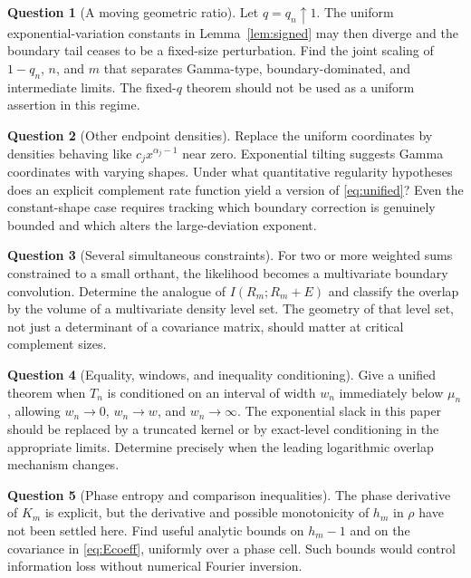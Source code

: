 \documentclass[11pt,a4paper]{article}
\numberwithin{equation}{section}
\theoremstyle{definition}
\newtheorem{question}{Question}
\theoremstyle{remark}
\begin{document}
\begin{question}[A moving geometric ratio]
Let $q=q_n\uparrow1$. The uniform exponential-variation constants in
Lemma~\ref{lem:signed} may then diverge and the boundary tail ceases
to be a fixed-size perturbation. Find the joint scaling of $1-q_n$,
$n$, and $m$ that separates Gamma-type, boundary-dominated, and
intermediate limits. The fixed-$q$ theorem should not be used as a
uniform assertion in this regime.
\end{question}

\begin{question}[Other endpoint densities]
Replace the uniform coordinates by densities behaving like
$c_jx^{\alpha_j-1}$ near zero. Exponential tilting suggests Gamma
coordinates with varying shapes. Under what quantitative regularity
hypotheses does an explicit complement rate function yield a version
of \eqref{eq:unified}? Even the constant-shape case requires tracking
which boundary correction is genuinely bounded and which alters the
large-deviation exponent.
\end{question}

\begin{question}[Several simultaneous constraints]
For two or more weighted sums constrained to a small orthant, the
likelihood becomes a multivariate boundary convolution. Determine the
analogue of $I(R_m;R_m+E)$ and classify the overlap by the volume of a
multivariate density level set. The geometry of that level set, not
just a determinant of a covariance matrix, should matter at critical
complement sizes.
\end{question}

\begin{question}[Equality, windows, and inequality conditioning]
Give a unified theorem when $T_n$ is conditioned on an interval of
width $w_n$ immediately below $\mu_n$, allowing $w_n\to0$, $w_n\to w$,
and $w_n\to\infty$. The exponential slack in this paper should be
replaced by a truncated kernel or by exact-level conditioning in the
appropriate limits. Determine precisely when the leading logarithmic
overlap mechanism changes.
\end{question}

\begin{question}[Phase entropy and comparison inequalities]
The phase derivative of $K_m$ is explicit, but the derivative and
possible monotonicity of $h_m$ in $\rho$ have not been settled here.
Find useful analytic bounds on $h_m-1$ and on the covariance in
\eqref{eq:Ecoeff}, uniformly over a phase cell. Such bounds would
control information loss without numerical Fourier inversion.
\end{question}
\end{document}

